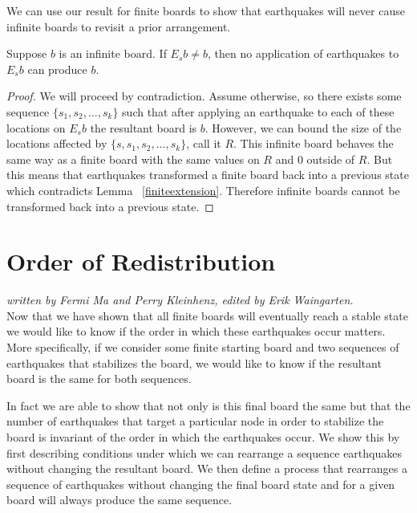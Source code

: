 \documentclass[runningheads,a4paper]{llncs}
\begin{document}
We can use our result for finite boards to show that earthquakes will never cause infinite boards to revisit a prior arrangement.  

\begin{corollary}
Suppose $b$ is an infinite board. If $E_s b \neq b$, then no application of earthquakes to $E_s b$ can produce $b$.
\end{corollary}

\begin{proof}
We will proceed by contradiction. Assume otherwise, so there exists some sequence $\{s_1, s_2, \ldots, s_k\}$ such that after applying an earthquake to each of these locations on $E_s b$ the resultant board is $b$.
However, we can bound the size of the locations affected by $\{s, s_1, s_2, \ldots, s_k \}$, call it $R$.  This infinite board behaves the same way as a finite board with the same values on $R$ and 0 outside of $R$. But this means that earthquakes transformed a finite board back into a previous state which contradicts Lemma ~\ref{finiteextension}. Therefore infinite boards cannot be transformed back into a previous state.
\end{proof}

\section{Order of Redistribution}
\label{Order of Redistribution}

\emph{written by Fermi Ma and Perry Kleinhenz, edited by Erik Waingarten.}\\

Now that we have shown that all finite boards will eventually reach a stable state we would like to know if the order in which these earthquakes occur matters. More specifically, if we consider some finite starting board and two sequences of earthquakes that stabilizes the board, we would like to know if the resultant board is the same for both sequences. 

In fact we are able to show that not only is this final board the same but that the number of earthquakes that target a particular node in order to stabilize the board is invariant of the order in which the earthquakes occur. We show this by first describing conditions under which we can rearrange a sequence earthquakes without changing the resultant board. We then define a process that rearranges a sequence of earthquakes without changing the final board state and for a given board will always produce the same sequence.\\
\end{document}
